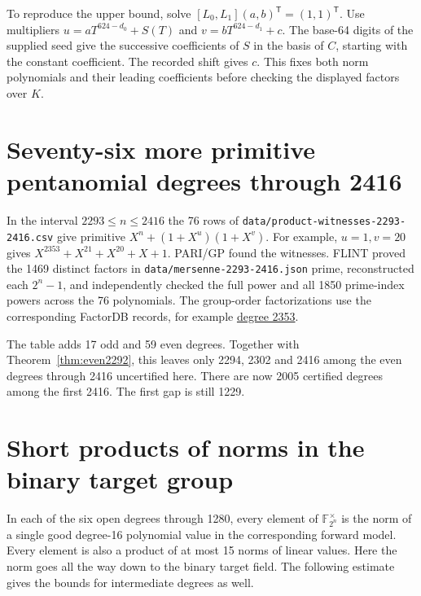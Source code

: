 \documentclass[11pt]{article}
\begin{document}
To reproduce the upper bound, solve \([L_0,L_1](a,b)^{\mathsf T}
=(1,1)^{\mathsf T}\). Use multipliers
\(u=aT^{624-d_0}+S(T)\) and \(v=bT^{624-d_1}+c\).
The base-64 digits of the supplied seed give the successive
coefficients of \(S\) in the basis of \(C\), starting with the constant
coefficient. The recorded shift gives \(c\). This fixes both norm
polynomials and their leading coefficients before checking the
displayed factors over \(K\).

\section{Seventy-six more primitive pentanomial degrees through 2416}
\label{sec:coverage-2416}
In the interval \(2293\le n\le2416\) the 76 rows of
\nolinkurl{data/product-witnesses-2293-2416.csv} give primitive
\(X^n+(1+X^u)(1+X^v)\). For example, \(u=1,v=20\) gives
\(X^{2353}+X^{21}+X^{20}+X+1\). PARI/GP found the witnesses.
FLINT proved the 1469 distinct factors in
\nolinkurl{data/mersenne-2293-2416.json} prime, reconstructed each
\(2^n-1\), and independently checked the full power and all 1850
prime-index powers across the 76 polynomials. The group-order
factorizations use the corresponding FactorDB records, for example
\href{https://factordb.com/index.php?query=2%5E2353-1}{degree 2353}.

The table adds 17 odd and 59 even degrees. Together with
Theorem~\ref{thm:even2292}, this leaves only 2294, 2302 and 2416
among the even degrees through 2416 uncertified here. There are now
2005 certified degrees among the first 2416. The first gap is still
1229.

\section{Short products of norms in the binary target group}\label{sec:binary-norm-cover}
In each of the six open degrees through 1280, every element of
\(\mathbb F_{2^n}^\times\) is the norm of a single good degree-16
polynomial value in the corresponding forward model. Every element
is also a product of at most 15 norms of linear values.
Here the norm goes all the way down to the binary target field.
The following estimate gives the bounds for intermediate degrees as well.
\end{document}
